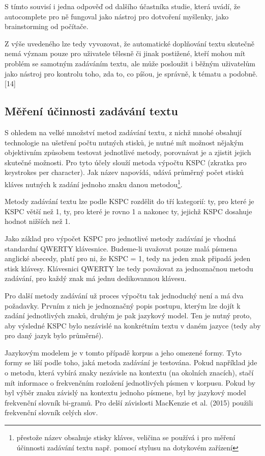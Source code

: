 \documentclass{article}
\begin{document}
S tímto souvisí i jedna odpověď od dalšího účastníka studie, která uvádí, že autocomplete pro ně fungoval jako nástroj pro dotvoření myšlenky, jako brainstorming od počítače. 

Z výše uvedeného lze tedy vyvozovat, že automatické doplňování textu skutečně nemá význam pouze pro uživatele tělesně či jinak postižené, kteří mohou mít problém se samotným zadáváním textu, ale může posloužit i běžným uživatelům jako nástroj pro kontrolu toho, zda to, co píšou, je správně, k tématu a podobně. [14]

\subsection{Měření účinnosti zadávání textu}

S ohledem na velké množství metod zadávání textu, z nichž mnohé obsahují technologie na ušetření počtu nutných stisků, je nutné mít možnost nějakým objektivním způsobem testovat jednotlivé metody, porovnávat je a zjistit jejich skutečné možnosti. Pro tyto účely slouží metoda výpočtu KSPC (zkratka pro keystrokes per character). Jak název napovídá, udává průměrný počet stisků kláves nutných k zadání jednoho znaku danou metodou\footnote{přestože název obsahuje stisky kláves, veličina se používá i pro měření účinnosti zadávání textu např. pomocí stylusu na dotykovém zařízení}.

Metody zadávání textu lze podle KSPC rozdělit do tří kategorií: ty, pro které je KSPC větší než 1, ty, pro které je rovno 1 a nakonec ty, jejichž KSPC dosahuje hodnot nižších než 1.

Jako základ pro výpočet KSPC pro jednotlivé metody zadávání je vhodná standardní QWERTY klávesnice. Budeme-li uvažovat pouze malá písmena anglické abecedy, platí pro ni, že KSPC = 1, tedy na jeden znak připadá jeden stisk klávesy. Klávesnici QWERTY lze tedy považovat za jednoznačnou metodu zadávání, pro každý znak má jednu dedikovannou klávesu.

Pro další metody zadávání už proces výpočtu tak jednoduchý není a má dva požadavky. Prvním z nich je jednoznačný popis postupu, kterým lze dojít k zadání jednotlivých znaků, druhým je pak jazykový model. Ten je nutný proto, aby výsledné KSPC bylo nezávislé na konkrétním textu v daném jazyce (tedy aby pro daný jazyk bylo průměrné).


Jazykovým modelem je v tomto případě korpus a jeho omezené formy. Tyto formy se liší podle toho, jaká metoda zadávání je testována. Pokud například jde o metodu, která vybírá znaky nezávisle na kontextu (na okolních znacích), stačí mít informace o frekvenčním rozložení jednotlivých písmen v korpusu. Pokud by byl výběr znaku závislý na kontextu jednoho písmene, byl by jazykový model frekvenční slovník bi-gramů. Pro delší závislosti MacKenzie et al. (2015) použili frekvenční slovník celých slov.
\end{document}
